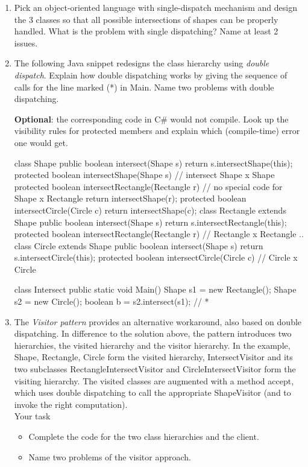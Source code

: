 \documentclass{article}
\begin{document}
\begin{enumerate}
\item Pick an object-oriented language with single-dispatch mechanism 
and design  the 3 classes so that all possible intersections
of shapes can be properly handled. 
What is the problem with single dispatching? Name at least 2 issues.
\item The following Java snippet redesigns the
class hierarchy using \textit{double dispatch}. 
Explain how double dispatching works by
giving the sequence of calls for the line marked (*) in \textsf{Main}.
Name two problems
with double dispatching.

\textbf{Optional}: the corresponding code in C\# would not 
compile. Look up the visibility rules for \textsf{protected} members
and explain which (compile-time) error one would get. 
\begin{java}
class Shape {
    public  boolean intersect(Shape s) {
         return s.intersectShape(this);
    }
    protected  boolean intersectShape(Shape s) {
        // intersect Shape x Shape
    }
    protected  boolean intersectRectangle(Rectangle r) {
        // no special code for Shape x Rectangle
        return intersectShape(r);
    }
    protected  boolean intersectCircle(Circle c) {
        return intersectShape(c);
   }
}
class Rectangle extends Shape {
    public  boolean intersect(Shape s) {
        return s.intersectRectangle(this);  
    }
    protected  boolean intersectRectangle(Rectangle r) {
        // Rectangle x Rectangle
        ..
    }
}
class Circle extends Shape {
    public  boolean intersect(Shape s) {
        return s.intersectCircle(this);  
    }
    protected  boolean intersectCircle(Circle c) {
        // Circle x Circle 
   }   
}

class Intersect {
   public static void Main() {
      Shape s1 = new Rectangle(); 
      Shape s2 = new Circle();
      boolean b = s2.intersect(s1);        // *
   }
}
\end{java}
\item The \textit{Visitor pattern} provides an alternative workaround,
also based on double dispatching. In difference
to the solution above, the pattern 
introduces two hierarchies, the visited
hierarchy and the visitor hierarchy. In the example,
 \textsf{Shape, Rectangle, Circle}
form the visited hierarchy, \textsf{IntersectVisitor} and its two
subclasses \textsf{RectangleIntersectVisitor} and \textsf{CircleIntersectVisitor}
form the visiting hierarchy. The visited classes are
augmented with a method \textsf{accept}, which uses double dispatching
to call the appropriate ShapeVisitor (and to invoke the
right computation). 
\\
Your task
\begin{itemize}
\item Complete the code for the two class hierarchies and the client.
\item Name two problems of the visitor approach.
\end{itemize}


\end{enumerate}
\end{document}
